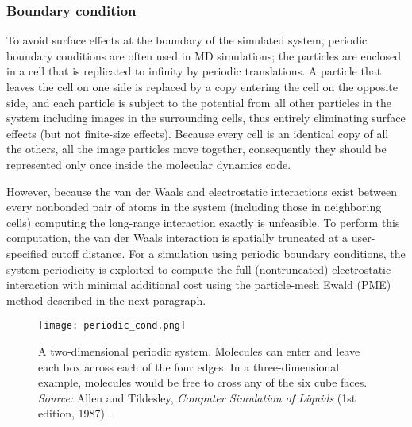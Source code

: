 \vspace{0.25cm}

\subsubsection{Boundary condition}
To avoid surface effects at the boundary of the simulated system, periodic boundary conditions are often used in MD simulations; the particles are enclosed in a cell that is replicated to infinity by periodic translations. A particle that leaves the cell on one side is replaced by a copy entering the cell on the opposite side, and each particle is subject to the potential from all other particles in the system including images in the surrounding cells, thus entirely eliminating surface effects (but not finite-size effects). Because every cell is an identical copy of all the others, all the image particles move together, consequently they should be represented only once inside the molecular dynamics code.

However, because the van der Waals and electrostatic interactions exist between every nonbonded pair of atoms in the system (including those in neighboring cells) computing the long-range interaction exactly is unfeasible. To perform this computation, the van der Waals interaction is spatially truncated at a user-specified cutoff distance. For a simulation using periodic boundary conditions, the system periodicity is exploited to compute the full (nontruncated) electrostatic interaction with minimal additional cost using the particle-mesh Ewald (PME) method described in the next paragraph.

\begin{figure}[H]
\centering
\begin{minipage}[t]{0.75\textwidth}
	\centering
    \texttt{[image: periodic\_cond.png]}
    
    \footnotesize{\caption{A two-dimensional periodic system. Molecules can enter and leave each box across each of the four edges. In a three-dimensional example, molecules would be free to cross any of the six cube faces.
    \textit{Source:} Allen and Tildesley, \textit{Computer Simulation of Liquids} (1st edition, 1987) 
    \cite{ref:AllenTildesley_1ed}.}
    \label{fig:PME}
    }
\end{minipage} 
\end{figure}

\vspace{0.25cm}

